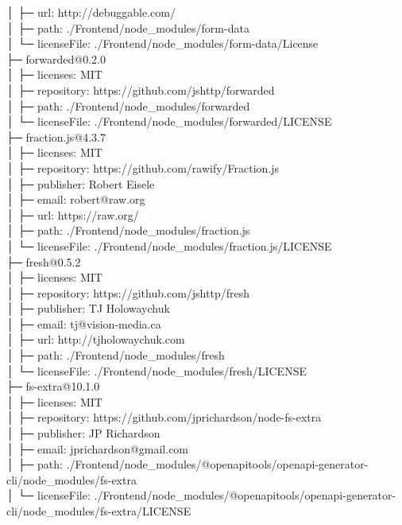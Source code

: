 │  ├─ url: http://debuggable.com/\\
│  ├─ path: ./Frontend/node\_modules/form-data\\
│  └─ licenseFile: ./Frontend/node\_modules/form-data/License\\
├─ forwarded@0.2.0\\
│  ├─ licenses: MIT\\
│  ├─ repository: https://github.com/jshttp/forwarded\\
│  ├─ path: ./Frontend/node\_modules/forwarded\\
│  └─ licenseFile: ./Frontend/node\_modules/forwarded/LICENSE\\
├─ fraction.js@4.3.7\\
│  ├─ licenses: MIT\\
│  ├─ repository: https://github.com/rawify/Fraction.js\\
│  ├─ publisher: Robert Eisele\\
│  ├─ email: robert@raw.org\\
│  ├─ url: https://raw.org/\\
│  ├─ path: ./Frontend/node\_modules/fraction.js\\
│  └─ licenseFile: ./Frontend/node\_modules/fraction.js/LICENSE\\
├─ fresh@0.5.2\\
│  ├─ licenses: MIT\\
│  ├─ repository: https://github.com/jshttp/fresh\\
│  ├─ publisher: TJ Holowaychuk\\
│  ├─ email: tj@vision-media.ca\\
│  ├─ url: http://tjholowaychuk.com\\
│  ├─ path: ./Frontend/node\_modules/fresh\\
│  └─ licenseFile: ./Frontend/node\_modules/fresh/LICENSE\\
├─ fs-extra@10.1.0\\
│  ├─ licenses: MIT\\
│  ├─ repository: https://github.com/jprichardson/node-fs-extra\\
│  ├─ publisher: JP Richardson\\
│  ├─ email: jprichardson@gmail.com\\
│  ├─ path: ./Frontend/node\_modules/@openapitools/openapi-generator-cli/node\_modules/fs-extra\\
│  └─ licenseFile: ./Frontend/node\_modules/@openapitools/openapi-generator-cli/node\_modules/fs-extra/LICENSE\\
